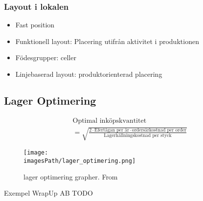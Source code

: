 \begin{multicols}{2}
\subsubsection{Layout i lokalen}
\begin{itemize}
    \item Fast position 
    \item Funktionell layout: Placering utifrån aktivitet i produktionen
    \item Födesgrupper: celler 
    \item Linjebaserad layout: produktorienterad placering
\end{itemize}

\subsection{Lager Optimering}
\begin{align*}
    &\text{Optimal inköpskvantitet} \\
    &= \sqrt{\frac{ 2\cdot\text{Efertågan per år}\cdot\text{ordersärkostnad per order} }{ \text{Lagerhållningskostnad per styck} }}
\end{align*}

\begin{figure}[H]
    \centering
    \texttt{[image: \\imagesPath/lager\_optimering.png]}
    \caption{lager optimering grapher. From \cite{im}}
\end{figure}

\begin{exampleblock}{Exempel WrapUp AB}
   TODO 
\end{exampleblock}


\end{multicols}
